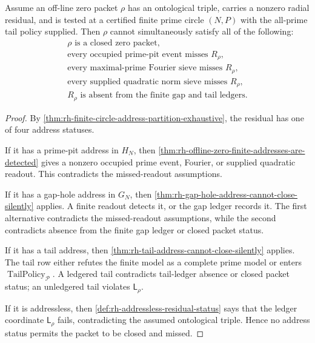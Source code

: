 \begin{theorem}
\label{thm:rh-offline-zero-ont-triple-cannot-be-closed-and-missed}
Assume an off-line zero packet $\rho$ has an ontological triple, carries
a nonzero radial residual, and is tested at a certified finite prime
circle $(N,P)$ with the all-prime tail policy supplied.  Then $\rho$
cannot simultaneously satisfy all of the following:
$$
\begin{gathered}
\rho\text{ is a closed zero packet},\\
\text{every occupied prime-pit event misses }R_\rho,\\
\text{every maximal-prime Fourier sieve misses }R_\rho,\\
\text{every supplied quadratic norm sieve misses }R_\rho,\\
R_\rho\text{ is absent from the finite gap and tail ledgers.}
\end{gathered}
$$
\end{theorem}

\begin{proof}
By
\autoref{thm:rh-finite-circle-address-partition-exhaustive}, the
residual has one of four address statuses.

If it has a prime-pit address in $H_N$, then
\autoref{thm:rh-offline-zero-finite-addresses-are-detected} gives a
nonzero occupied prime event, Fourier, or supplied quadratic readout.
This contradicts the missed-readout assumptions.

If it has a gap-hole address in $G_N$, then
\autoref{thm:rh-gap-hole-address-cannot-close-silently} applies.  A
finite readout detects it, or the gap ledger records it.  The first
alternative contradicts the missed-readout assumptions, while the
second contradicts absence from the finite gap ledger or closed packet
status.

If it has a tail address, then
\autoref{thm:rh-tail-address-cannot-close-silently} applies.  The tail
row either refutes the finite model as a complete prime model or enters
$\operatorname{TailPolicy}_{\mathcal P}$.  A ledgered tail contradicts
tail-ledger absence or closed packet status; an unledgered tail violates
$\mathsf L_\rho$.

If it is addressless, then
\autoref{def:rh-addressless-residual-status} says that the ledger
coordinate $\mathsf L_\rho$ fails, contradicting the assumed
ontological triple.  Hence no address status permits the packet to be
closed and missed.
\end{proof}

